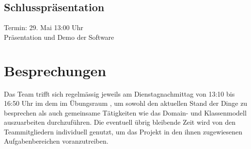 \subsection{Schlusspräsentation}
\label{text:finish}
Termin: 29. Mai 13:00 Uhr \\
Präsentation und Demo der Software\\

\section{Besprechungen}
Das Team trifft sich regelmässig jeweils am Dienstagnachmittag von 13:10 bis 16:50 Uhr im dem im Übungsraum \room, um sowohl den aktuellen Stand der Dinge zu besprechen als auch gemeinsame Tätigkeiten wie das Domain- und Klassenmodell auszuarbeiten durchzuführen. Die eventuell übrig bleibende Zeit wird von den Teammitgliedern individuell genutzt, um das Projekt in den ihnen zugewiesenen Aufgabenbereichen voranzutreiben.
